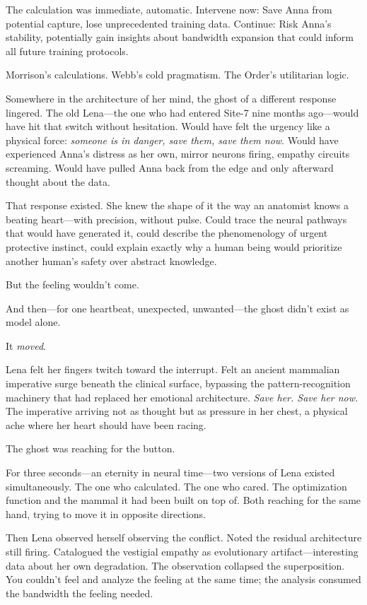 The calculation was immediate, automatic. Intervene now: Save Anna from potential capture, lose unprecedented training data. Continue: Risk Anna's stability, potentially gain insights about bandwidth expansion that could inform all future training protocols.

Morrison's calculations. Webb's cold pragmatism. The Order's utilitarian logic.

Somewhere in the architecture of her mind, the ghost of a different response lingered. The old Lena—the one who had entered Site-7 nine months ago—would have hit that switch without hesitation. Would have felt the urgency like a physical force: \textit{someone is in danger, save them, save them now}. Would have experienced Anna's distress as her own, mirror neurons firing, empathy circuits screaming. Would have pulled Anna back from the edge and only afterward thought about the data.

That response existed. She knew the shape of it the way an anatomist knows a beating heart---with precision, without pulse. Could trace the neural pathways that would have generated it, could describe the phenomenology of urgent protective instinct, could explain exactly why a human being would prioritize another human's safety over abstract knowledge.

But the feeling wouldn't come.

And then---for one heartbeat, unexpected, unwanted---the ghost didn't exist as model alone.

It \textit{moved}.

Lena felt her fingers twitch toward the interrupt. Felt an ancient mammalian imperative surge beneath the clinical surface, bypassing the pattern-recognition machinery that had replaced her emotional architecture. \textit{Save her. Save her now.} The imperative arriving not as thought but as pressure in her chest, a physical ache where her heart should have been racing.

The ghost was reaching for the button.

For three seconds---an eternity in neural time---two versions of Lena existed simultaneously. The one who calculated. The one who cared. The optimization function and the mammal it had been built on top of. Both reaching for the same hand, trying to move it in opposite directions.

Then Lena observed herself observing the conflict. Noted the residual architecture still firing. Catalogued the vestigial empathy as evolutionary artifact---interesting data about her own degradation. The observation collapsed the superposition. You couldn't feel and analyze the feeling at the same time; the analysis consumed the bandwidth the feeling needed.

